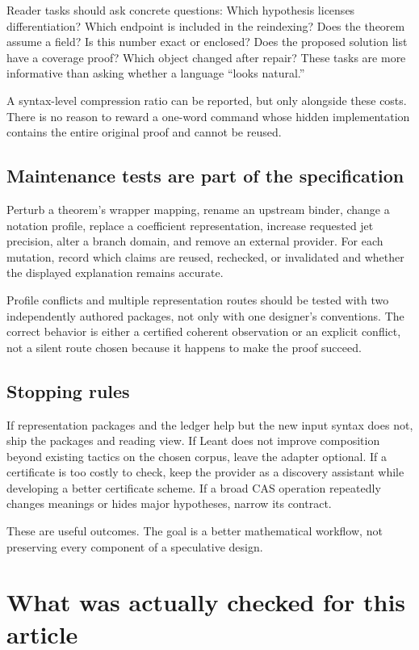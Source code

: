 \documentclass[11pt,a4paper]{article}
\theoremstyle{definition}
\theoremstyle{remark}
\begin{document}
Reader tasks should ask concrete questions: Which hypothesis licenses differentiation? Which endpoint is included in the reindexing? Does the theorem assume a field? Is this number exact or enclosed? Does the proposed solution list have a coverage proof? Which object changed after repair? These tasks are more informative than asking whether a language ``looks natural.''

A syntax-level compression ratio can be reported, but only alongside these costs. There is no reason to reward a one-word command whose hidden implementation contains the entire original proof and cannot be reused.

\subsection{Maintenance tests are part of the specification}
Perturb a theorem's wrapper mapping, rename an upstream binder, change a notation profile, replace a coefficient representation, increase requested jet precision, alter a branch domain, and remove an external provider. For each mutation, record which claims are reused, rechecked, or invalidated and whether the displayed explanation remains accurate.

Profile conflicts and multiple representation routes should be tested with two independently authored packages, not only with one designer's conventions. The correct behavior is either a certified coherent observation or an explicit conflict, not a silent route chosen because it happens to make the proof succeed.

\subsection{Stopping rules}
If representation packages and the ledger help but the new input syntax does not, ship the packages and reading view. If Leant does not improve composition beyond existing tactics on the chosen corpus, leave the adapter optional. If a certificate is too costly to check, keep the provider as a discovery assistant while developing a better certificate scheme. If a broad CAS operation repeatedly changes meanings or hides major hypotheses, narrow its contract.

These are useful outcomes. The goal is a better mathematical workflow, not preserving every component of a speculative design.

\section{What was actually checked for this article}\label{sec:experiments}
\end{document}
